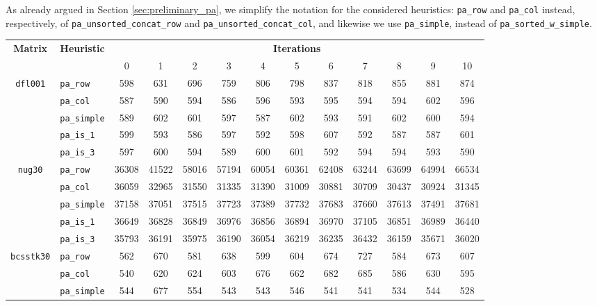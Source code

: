 As already argued in Section \ref{sec:preliminary_pa}, we simplify the notation for the considered heuristics: \verb|pa_row| and \verb|pa_col| instead, respectively, of \verb|pa_unsorted_concat_row| and \verb|pa_unsorted_concat_col|, and likewise we use \verb|pa_simple|, instead of \verb|pa_sorted_w_simple|.

\begin{table}
	\centering
	\renewcommand{\arraystretch}{1.2}
	\begin{tabular}{|c|l|c||c|c|c|c|c|c|c|c|c|c|}
		\hline
		\multirow{2}{*}{\textbf{Matrix}} &\multirow{2}{*}{\textbf{Heuristic}} & \multicolumn{11}{c|}{\textbf{Iterations}} \\ \cline{3-13} 
		&& 0 & 1 & 2 & 3 & 4 & 5 & 6 & 7 & 8 & 9 & 10 \\ \hline
		\multirow{5}{*}{\texttt{dfl001}}		&\verb|pa_row| & 598 & 631 & 696 & 759 & 806 & 798 & 837 & 818 & 855 & 881 & 874 \\ 
		&\verb|pa_col| &  587&  590 & 594 & 586 & 596 & 593 & 595 & 594 & 594 & 602 & 596 \\ 
		&\verb|pa_simple| & 589 & 602 & 601 & 597 & 587 & 602 & 593 & 591 & 602 & 600 & 594 \\
		&\verb|pa_is_1| & 599 & 593 & 586 & 597 & 592 & 598 & 607 & 592 & 587 & 587  & 601 \\
		&\verb|pa_is_3| & 597 & 600 & 594 & 589 & 600 & 601 & 592 & 594 & 594 & 593 & 590 \\
		\hline
		\multirow{5}{*}{\texttt{nug30}}		&\verb|pa_row| & 	36308 & 41522 & 58016 & 57194 & 60054 & 60361 & 62408 & 63244 & 63699 & 64994 & 66534 \\ 
		&\verb|pa_col| & 36059 & 32965&  31550 & 31335 & 31390 & 31009 & 30881 & 30709 & 30437 & 30924 & 31345 \\
		&\verb|pa_simple| & 37158 & 37051 & 37515 & 37723 & 37389 & 37732 & 37683 & 37660 & 37613 & 37491 & 37681 \\
		&\verb|pa_is_1| & 	36649 & 36828 & 36849 & 36976 & 36856 & 36894 & 36970 & 37105 & 36851 & 36989 & 36440 \\
		&\verb|pa_is_3| & 35793 & 36191 & 35975 & 36190 & 36054 & 36219 & 36235 & 36432 & 36159 & 35671 & 36020 \\ \hline
		\multirow{5}{*}{\texttt{bcsstk30}}		&\verb|pa_row| &  562 & 670 & 581&  638 &  599 &  604 &  674 &  727&   584&   673 &  607 \\ 
		&\verb|pa_col| & 540 &  620 & 624 & 603 & 676 & 662 & 682 & 685 & 586 & 630 & 595 \\ 
		&\verb|pa_simple| &544 & 677 & 554 & 543 & 543 & 546 & 541 & 541 & 534 & 544 & 528 \\

\end{tabular}
\end{table}
